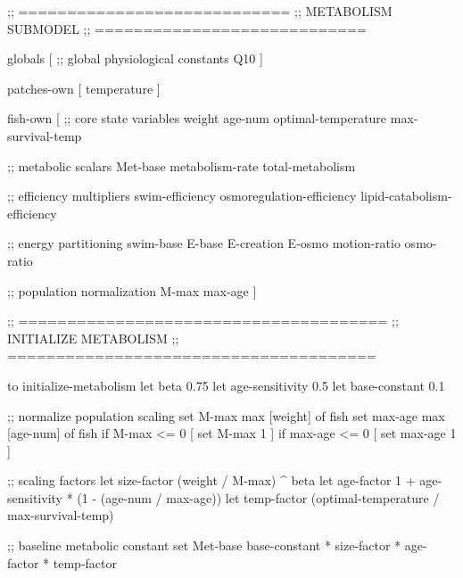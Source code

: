 \documentclass[
]{book}
\newenvironment{Shaded}{\begin{snugshade}}{\end{snugshade}}
\newcommand{\NormalTok}[1]{#1}
\begin{document}
\begin{Shaded}
\begin{Highlighting}[]

\NormalTok{;; ============================}
\NormalTok{;;   METABOLISM SUBMODEL}
\NormalTok{;; ============================}

\NormalTok{globals [}
\NormalTok{  ;; global physiological constants}
\NormalTok{  Q10}
\NormalTok{]}

\NormalTok{patches{-}own [}
\NormalTok{  temperature}
\NormalTok{]}

\NormalTok{fish{-}own [}
\NormalTok{  ;; core state variables}
\NormalTok{  weight}
\NormalTok{  age{-}num}
\NormalTok{  optimal{-}temperature}
\NormalTok{  max{-}survival{-}temp}

\NormalTok{  ;; metabolic scalars}
\NormalTok{  Met{-}base}
\NormalTok{  metabolism{-}rate}
\NormalTok{  total{-}metabolism}

\NormalTok{  ;; efficiency multipliers}
\NormalTok{  swim{-}efficiency}
\NormalTok{  osmoregulation{-}efficiency}
\NormalTok{  lipid{-}catabolism{-}efficiency}

\NormalTok{  ;; energy partitioning}
\NormalTok{  swim{-}base}
\NormalTok{  E{-}base}
\NormalTok{  E{-}creation}
\NormalTok{  E{-}osmo}
\NormalTok{  motion{-}ratio}
\NormalTok{  osmo{-}ratio}

\NormalTok{  ;; population normalization}
\NormalTok{  M{-}max}
\NormalTok{  max{-}age}
\NormalTok{]}

\NormalTok{;; ======================================}
\NormalTok{;;       INITIALIZE METABOLISM}
\NormalTok{;; ======================================}

\NormalTok{to initialize{-}metabolism}
\NormalTok{  let beta 0.75}
\NormalTok{  let age{-}sensitivity 0.5}
\NormalTok{  let base{-}constant 0.1}
  
\NormalTok{  ;; normalize population scaling}
\NormalTok{  set M{-}max max [weight] of fish}
\NormalTok{  set max{-}age max [age{-}num] of fish}
\NormalTok{  if M{-}max \textless{}= 0 [ set M{-}max 1 ]}
\NormalTok{  if max{-}age \textless{}= 0 [ set max{-}age 1 ]}

\NormalTok{  ;; scaling factors}
\NormalTok{  let size{-}factor (weight / M{-}max) \^{} beta}
\NormalTok{  let age{-}factor 1 + age{-}sensitivity * (1 {-} (age{-}num / max{-}age))}
\NormalTok{  let temp{-}factor (optimal{-}temperature / max{-}survival{-}temp)}

\NormalTok{  ;; baseline metabolic constant}
\NormalTok{  set Met{-}base base{-}constant * size{-}factor * age{-}factor * temp{-}factor}


\end{Highlighting}
\end{Shaded}
\end{document}
